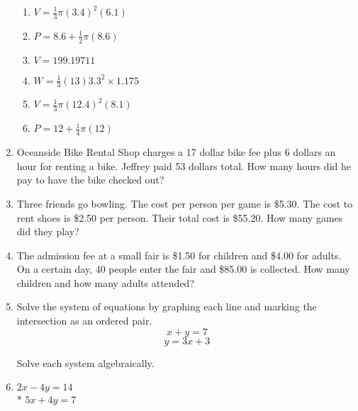 \begin{enumerate}
\begin{multicols}{2}
\begin{enumerate}[itemsep=2cm]
      \item $V=\frac{1}{3} \pi (3.4)^2(6.1)$
      \item $P=8.6 + \frac{1}{2} \pi (8.6)$  
      \item $V=199.19711$
      \item $W=\frac{1}{3} (13)  3.3^2 \times 1.175$
      \item $V=\frac{1}{3} \pi (12.4)^2(8.1)$
      \item $P=12 + \frac{1}{4} \pi (12)$ 
    \end{enumerate}
    \end{multicols}\vspace{2cm}
  
     
  
  \newpage
    \item Oceanside Bike Rental Shop charges a 17 dollar bike fee plus 6 dollars an hour for renting a bike. Jeffrey paid 53 dollars total. How many hours did he pay to have the bike checked out? \vspace{6cm}
  
    \item Three friends go bowling. The cost per person per game is \$5.30. The cost to rent shoes is \$2.50 per person. Their total cost is \$55.20. How many games did they play? \vspace{6cm}
  
    \item The admission fee at a small fair is \$1.50 for children and \$4.00 for adults. On a certain day, 40 people enter the fair and \$85.00 is collected. How many children and how many adults attended?
  
\newpage
\item Solve the system of equations by graphing each line and marking the intersection as an ordered pair.
      \[x+y=7\]
      \[y=3x+3\]
  
  \begin{center} %
  \end{center}
  
  \newpage
    Solve each system algebraically.
    \item
    $2x-4y=14$\\*
    $5x+4y=7$ \vspace{6cm}
  

\end{enumerate}
